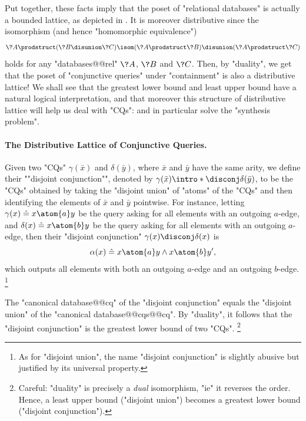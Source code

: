 Put together, these facts imply that the poset of "relational databases" is
actually a bounded lattice, as depicted in .
It is moreover distributive
since the isomorphism (and hence "homomorphic equivalence")
\[
	\?A \prodstruct (\?B \disunion \?C) \isom (\?A \prodstruct \?B) \disunion (\?A \prodstruct \?C)
\]
holds for any "databases@@rel" $\?A$, $\?B$ and $\?C$.
Then, by "duality", we get that the poset of "conjunctive queries"
under "containment" is also a distributive lattice!
We shall see that the greatest lower bound and least upper bound
have a natural logical interpretation, and that moreover
this structure of distributive lattice will help us
deal with "CQs": and in particular
solve the "synthesis problem". 


\paragraph*{The Distributive Lattice of Conjunctive Queries.}

Given two "CQs" $\gamma(\bar x)$ and $\delta(\bar y)$,
where $\bar x$ and $\bar y$ have the same arity, we define
their \AP""disjoint conjunction"", denoted by
$\gamma(\bar x) \intro*\disconj \delta(\bar y)$,
to be the "CQs" obtained by taking the "disjoint union" of "atoms" 
of the "CQs" and then identifying the elements of $\bar x$ and $\bar y$ pointwise.
For instance, letting $\gamma(x) \defeq x \atom{a} y$ be the query
asking for all elements with an outgoing $a$-edge,
and $\delta(x) \defeq x \atom{b} y$ be the query
asking for all elements with an outgoing $a$-edge,
then their "disjoint conjunction" $\gamma(x) \disconj \delta(x)$ is
\[
	\alpha(x) \defeq x \atom{a} y \land x \atom{b} y',
\]
which outputs all elements with both an outgoing $a$-edge and an outgoing $b$-edge.%
\footnote{As for "disjoint union", the name "disjoint conjunction" is slightly abusive
but justified by its universal property.}

\begin{fact}
	The "canonical database@@cq" of the "disjoint conjunction"
	equals the "disjoint union" of the "canonical database@@cqs@@cq".
	By "duality", it follows that
	the "disjoint conjunction" is the greatest lower bound
	of two "CQs".%
	\footnote{Careful: "duality" is precisely a \emph{dual} isomorphism,
	"ie" it reverses the order. Hence, a least upper bound ("disjoint union")
	becomes a greatest lower bound ("disjoint conjunction").}
\end{fact}

